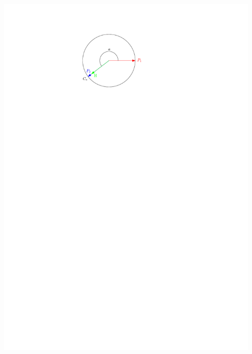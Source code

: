 \documentclass[11pt]{article}
\begin{document}
\begin{center}
\includegraphics{Q2S1_Eq/Q2S1_Old/Q2S1_DetourExample0.pdf} \hfill

\end{center}
\end{document}
